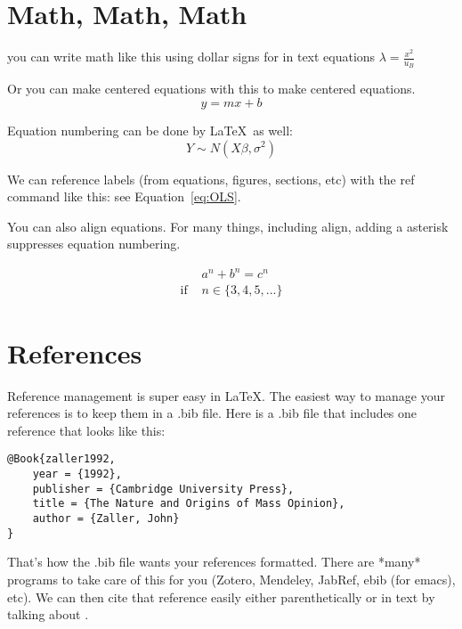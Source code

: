 \documentclass[12pt]{article} %
\begin{document}
\section{Math, Math, Math}

you can write math like this using dollar signs for in text equations $\lambda=\frac{x^2}{u_B}$

Or you can make centered equations with this to make centered equations.
\[y=mx+b\]

Equation numbering can be done by \LaTeX~as well:
\begin{equation}
  \label{eq:OLS}
  Y \sim N(X\beta, \sigma^2)
\end{equation}

We can reference labels (from equations, figures, sections, etc) with
the ref command like this: see Equation~\eqref{eq:OLS}. %


You can also align equations. For many things, including align, adding a asterisk suppresses equation numbering. 

\begin{align*}
&a^n+b^n=c^n\\
\text{if   } & n \in \{3, 4, 5,...\}
\end{align*}



\section{References}
Reference management is super easy in \LaTeX. The easiest way to
manage your references is to keep them in a .bib file. Here is a .bib file that includes one reference that looks like this: 

\begin{verbatim}
@Book{zaller1992,
	year = {1992},
	publisher = {Cambridge University Press},
	title = {The Nature and Origins of Mass Opinion},
	author = {Zaller, John}
}
\end{verbatim}

That's how the .bib file wants your references formatted. There
are *many* programs to take care of this for you (Zotero, Mendeley,
JabRef, ebib (for emacs), etc). We can then cite that reference easily
either parenthetically \citep{zaller1992} or in text by talking about
\citet{zaller1992}. %
\end{document}
